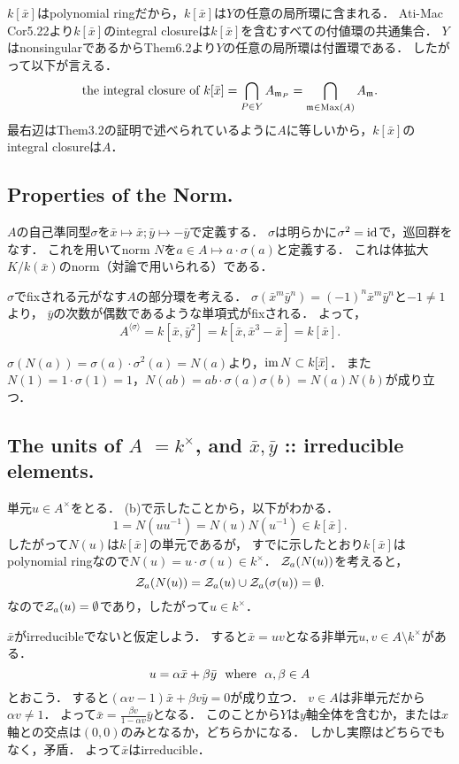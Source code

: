 \documentclass[a4paper]{jsarticle}
\begin{document}
    $k[\bar{x}]$はpolynomial ringだから，$k[\bar{x}]$は$Y$の任意の局所環に含まれる．
    Ati-Mac Cor5.22より$k[\bar{x}]$のintegral closureは$k[\bar{x}]$を含むすべての付値環の共通集合．
    $Y$はnonsingularであるからThem6.2より$Y$の任意の局所環は付置環である．
    したがって以下が言える．
    \[ \text{the integral closure of }k[\bar{x}] = \bigcap_{P \in Y} A_{\mathfrak{m}_P}=\bigcap_{\mathfrak{m} \in \operatorname{Max}(A)} A_{\mathfrak{m}}. \]
    最右辺はThem3.2の証明で述べられているように$A$に等しいから，$k[\bar{x}]$のintegral closureは$A$．

    \subsection{Properties of the Norm.}
    $A$の自己準同型$\sigma$を$\bar{x} \mapsto \bar{x}; \bar{y} \mapsto -\bar{y}$で定義する．
    $\sigma$は明らかに$\sigma^2=\mathrm{id}_{}$で，巡回群をなす．
    これを用いてnorm $N$を$a \in A \mapsto a \cdot \sigma(a)$と定義する．
    これは体拡大$K/k(\bar{x})$のnorm（対論で用いられる）である．

    $\sigma$でfixされる元がなす$A$の部分環を考える．
    $\sigma(\bar{x}^m \bar{y}^n)=(-1)^n \bar{x}^m \bar{y}^n$と$-1 \neq 1$より，
    $\bar{y}$の次数が偶数であるような単項式がfixされる．
    よって，
    \[ A^{\langle \sigma \rangle}=k[\bar{x}, \bar{y}^2]=k[\bar{x}, \bar{x}^3-\bar{x}]=k[\bar{x}]. \]

    $\sigma(N(a))=\sigma(a) \cdot \sigma^2(a)=N(a)$より，$\operatorname{im} N \subset k[\bar{x}]$．
    また$N(1)=1 \cdot \sigma(1)=1$，$N(ab)=ab \cdot \sigma(a) \sigma(b)=N(a)N(b)$が成り立つ．

    \subsection{The units of $A$ $=k^{\times}$, and $\bar{x}, \bar{y}$ :: irreducible elements.}
    単元$u \in A^{\times}$をとる．
    (b)で示したことから，以下がわかる．
    \[ 1=N(u u^{-1})=N(u) N(u^{-1}) \in k[\bar{x}]. \]
    したがって$N(u)$は$k[\bar{x}]$の単元であるが，
    すでに示したとおり$k[\bar{x}]$はpolynomial ringなので$N(u)=u \cdot \sigma(u) \in k^{\times}$．
    $\mathcal{Z}_a(N(u))$を考えると，
    \[ \mathcal{Z}_a(N(u))=\mathcal{Z}_a(u) \cup \mathcal{Z}_a(\sigma(u))=\emptyset. \]
    なので$\mathcal{Z}_a(u)=\emptyset$であり，したがって$u \in k^{\times}$．

    $\bar{x}$がirreducibleでないと仮定しよう．
    すると$\bar{x}=u v$となる非単元$u,v \in A \setminus k^{\times}$がある．
    \[ u=\alpha \bar{x}+\beta \bar{y} \text{~~where~~} \alpha,\beta \in A \]
    とおこう．
    すると$(\alpha v-1) \bar{x}+\beta v \bar{y}=0$が成り立つ．
    $v \in A$は非単元だから$\alpha v \neq 1$．
    よって$\bar{x}=\frac{\beta v}{1- \alpha v} \bar{y}$となる．
    このことから$Y$は$y$軸全体を含むか，または$x$軸との交点は$(0,0)$のみとなるか，どちらかになる．
    しかし実際はどちらでもなく，矛盾．
    よって$\bar{x}$はirreducible．
\end{document}
